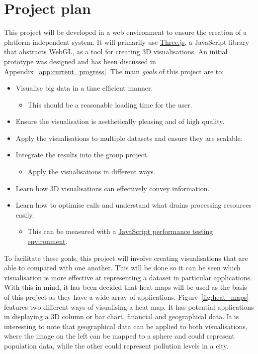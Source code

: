 \documentclass[
	fontsize=11pt
	headlines=2,
	footlines=2,
	parskip=half
]{scrartcl}
\begin{document}
	\section{Project plan} {
	\label{sec:project_plan}
		
		This project will be developed in a web environment to ensure the creation of a platform independent system. It will primarily use \href{http://threejs.org/}{Three.js}, a JavaScript library that abstracts WebGL, as a tool for creating 3D visualisations. An initial prototype was designed and has been discussed in Appendix~\ref{app:current_progress}. The main \emph{goals} of this project are to:
		
		\begin{itemize}
			\item Visualise big data in a time efficient manner.
			\begin{itemize}
				\item This should be a reasonable loading time for the user.
			\end{itemize}
			\item Ensure the visualisation is aesthetically pleasing and of high quality.
			\item Apply the visualisations to multiple datasets and ensure they are scalable. 
			\item Integrate the results into the group project.
			\begin{itemize}
				\item Apply the visualisations in different ways.
			\end{itemize}
			\item Learn how 3D visualisations can effectively convey information.
			\item Learn how to optimise calls and understand what drains processing resources easily.
			\begin{itemize}
				\item This can be measured with a \href{http://jsperf.com/}{JavaScript performance testing environment}.
			\end{itemize}
		\end{itemize}
		
		To facilitate these goals, this project will involve creating visualisations that are able to compared with one another. This will be done so it can be seen which visualisation is more effective at representing a dataset in particular applications. With this in mind, it has been decided that heat maps will be used as the basis of this project as they have a wide array of applications. Figure~\ref{fig:heat_maps} features two different ways of visualising a heat map. It has potential applications in displaying a 3D column or bar chart, financial and geographical data. It is interesting to note that geographical data can be applied to both visualisations, where the image on the left can be mapped to a sphere and could represent population data, while the other could represent pollution levels in a city.
		
}
\end{document}
